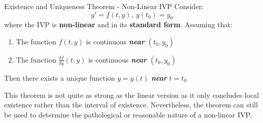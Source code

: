 \documentclass[12pt]{article}
\begin{document}
\begin{definition}{Existence and Uniqueness Theorem - Non-Linear IVP}
  Consider:
  \begin{equation*}
    y' = f(t,y),\ y(t_0) = y_0
  \end{equation*}
  where the IVP is \textbf{non-linear} and in its \textbf{standard form}.
  Assuming that:
  \begin{enumerate}
    \itemsep0em
    \item The function $f(t,y)$ is continuous \textit{\textbf{near}} $(t_0,y_0)$
    \item The function $\frac{\delta f}{\delta y}(t,y)$ is continuous \textbf{\textit{near}} $(t_0,y_0)$
  \end{enumerate}
  Then there exists a unique function $y = y(t)$ \textbf{\textit{near}} $t=t_0$
\end{definition}
This theorem is not quite as strong as the linear version as it only concludes local existence rather than the interval of existence. Nevertheless, the theorem can still be used to determine the pathological or reasonable nature of a non-linear IVP.
\end{document}
